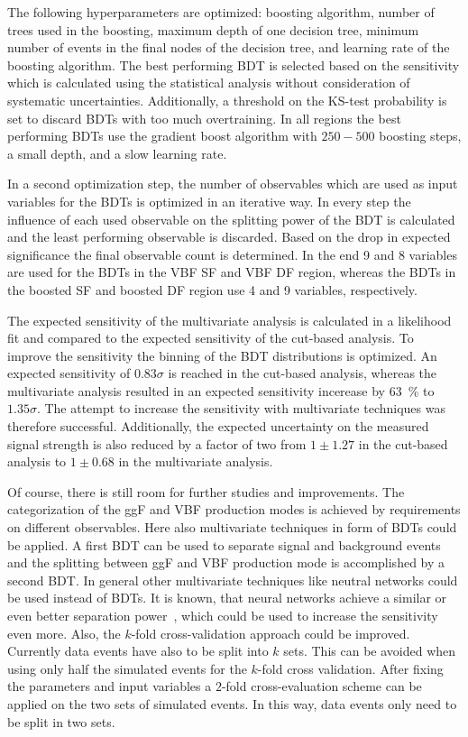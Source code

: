 The following hyperparameters are optimized: boosting algorithm, number of trees used in the boosting, maximum depth of one decision tree,
minimum number of events in the final nodes of the decision tree, and learning rate of the boosting algorithm.
The best performing BDT is selected based on the sensitivity which is calculated using the statistical analysis without consideration of systematic uncertainties.
Additionally, a threshold on the KS-test probability is set to discard BDTs with too much overtraining.
In all regions the best performing BDTs use the gradient boost algorithm with $250 - 500$ boosting steps, a small depth, and a slow learning rate.

In a second optimization step, the number of observables which are used as input variables for the BDTs is optimized in
an iterative way.
In every step the influence of each used observable on the splitting power of the BDT is calculated and the least performing observable is discarded.
Based on the drop in expected significance the final observable count is determined.
In the end 9 and 8 variables are used for the BDTs in the VBF SF and VBF DF region, whereas the BDTs in the boosted SF
and boosted DF region use 4 and 9 variables, respectively.

The expected sensitivity of the multivariate analysis is calculated in a likelihood fit and compared to the expected sensitivity of
the cut-based analysis.
To improve the sensitivity the binning of the BDT distributions is optimized.
An expected sensitivity of $0.83\sigma$ is reached in the cut-based analysis, whereas the multivariate analysis resulted in
an expected sensitivity incerease by \SI{63}{\percent} to $1.35\sigma$.
The attempt to increase the sensitivity with multivariate techniques was therefore successful.
Additionally, the expected uncertainty on the measured signal strength is also reduced by a factor of two
from $1 \pm 1.27$ in the cut-based analysis to $1 \pm 0.68$ in the multivariate analysis.

Of course, there is still room for further studies and improvements.
The categorization of the ggF and VBF production modes is achieved by requirements on different observables.
Here also multivariate techniques in form of BDTs could be applied.
A first BDT can be used to separate signal and background events and the splitting between ggF and VBF production
mode is accomplished by a second BDT\@.
In general other multivariate techniques like neutral networks could be used instead of BDTs.
It is known, that neural networks achieve a similar or even better separation power~\cite{TMVA}, which could be used to increase
the sensitivity even more.
Also, the $k$-fold cross-validation approach could be improved.
Currently data events have also to be split into $k$ sets.
This can be avoided when using only half the simulated events for the $k$-fold cross validation.
After fixing the parameters and input variables a $2$-fold cross-evaluation scheme can be applied on the two sets of simulated events.
In this way, data events only need to be split in two sets.
